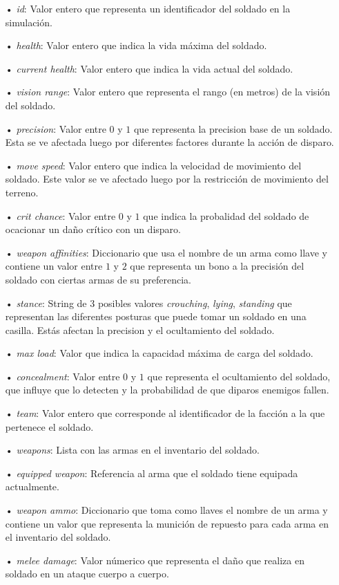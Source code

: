 \documentclass[twoside]{article}
\begin{document}
\begin{itemize}
	\item[•] \emph{id}: Valor entero que representa un identificador del soldado en la simulaci\'on.
	\item[•] \emph{health}: Valor entero que indica la vida m\'axima del soldado.
	\item[•] \emph{current health}: Valor entero que indica la vida actual del soldado.
	\item[•] \emph{vision range}: Valor entero que representa el rango (en metros) de la visi\'on del soldado.
	\item[•] \emph{precision}: Valor entre $0$ y $1$ que representa la precision base de un soldado. Esta se ve afectada luego por diferentes factores durante la acci\'on de disparo.
	\item[•] \emph{move speed}: Valor entero que indica la velocidad de movimiento del soldado. Este valor se ve afectado luego por la restricci\'on de movimiento del terreno.
	\item[•] \emph{crit chance}: Valor entre $0$ y $1$ que indica la probalidad del soldado de ocacionar un da\~no cr\'itico con un disparo.
	\item[•] \emph{weapon affinities}: Diccionario que usa el nombre de un arma como llave y contiene un valor entre $1$ y $2$ que representa un bono a la precisi\'on del soldado con ciertas armas de su preferencia.
	\item[•] \emph{stance}: String de $3$ posibles valores \emph{crouching}, \emph{lying}, \emph{standing} que representan las diferentes posturas que puede tomar un soldado en una casilla. Est\'as afectan la precision y el ocultamiento del soldado.
	\item[•] \emph{max load}: Valor que indica la capacidad m\'axima de carga del soldado.
	\item[•] \emph{concealment}: Valor entre $0$ y $1$ que representa el ocultamiento del soldado, que influye que lo detecten y la probabilidad de que diparos enemigos fallen.
	\item[•] \emph{team}: Valor entero que corresponde al identificador de la facci\'on a la que pertenece el soldado.
	\item[•] \emph{weapons}: Lista con las armas en el inventario del soldado.
	\item[•]\emph{equipped weapon}: Referencia al arma que el soldado tiene equipada actualmente.
	\item[•] \emph{weapon ammo}: Diccionario que toma como llaves el nombre de un arma y contiene un valor que representa la munici\'on de repuesto para cada arma en el inventario del soldado.
	\item[•] \emph{melee damage}: Valor n\'umerico que representa el da\~no que realiza en soldado en un ataque cuerpo a cuerpo.
\end{itemize}
\end{document}

